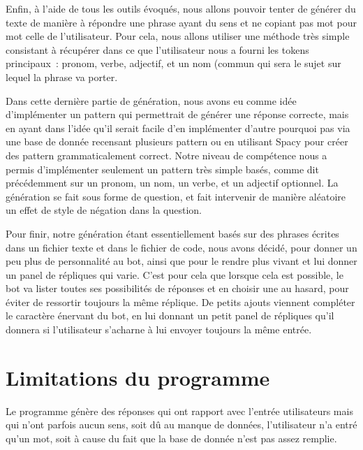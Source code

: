 \documentclass[paper=a4, fontsize=11pt]{article}
\begin{document}
	
	Enfin, à l’aide de tous les outils évoqués, nous allons pouvoir tenter de générer du texte de manière à répondre une phrase ayant du sens et ne copiant pas mot pour mot celle de l’utilisateur. Pour cela, nous allons utiliser une méthode très simple consistant à récupérer dans ce que l’utilisateur nous a fourni les tokens principaux : pronom, verbe, adjectif, et un nom (commun qui sera le sujet sur lequel la phrase va porter. 
	
	
	Dans cette dernière partie de génération, nous avons eu comme idée d’implémenter un pattern qui permettrait de générer une réponse correcte, mais en ayant dans l’idée qu’il serait facile d’en implémenter d’autre pourquoi pas via une base de donnée recensant plusieurs pattern ou en utilisant Spacy pour créer des pattern grammaticalement correct. Notre niveau de compétence nous a permis d’implémenter seulement un pattern très simple basés, comme dit précédemment sur un pronom, un nom, un verbe, et un adjectif optionnel. La génération se fait sous forme de question, et fait intervenir de manière aléatoire un effet de style de négation dans la question.
	
	
	Pour finir, notre génération étant essentiellement basés sur des phrases écrites dans un fichier texte et dans le fichier de code, nous avons décidé, pour donner un peu plus de personnalité au bot, ainsi que pour le rendre plus vivant et lui donner un panel de répliques qui varie. C’est pour cela que lorsque cela est possible, le bot va lister toutes ses possibilités de réponses et en choisir une au hasard, pour éviter de ressortir toujours la même réplique. De petits ajouts viennent compléter le caractère énervant du bot, en lui donnant un petit panel de répliques qu’il donnera si l’utilisateur s’acharne à lui  envoyer toujours la même entrée.
	
\section{Limitations du programme}
Le programme génère des réponses qui ont rapport avec l’entrée utilisateurs mais qui n’ont parfois aucun sens, soit dû au manque de données, l’utilisateur n’a entré qu’un mot, soit à cause du fait que la base de donnée n’est pas assez remplie.
\end{document}
